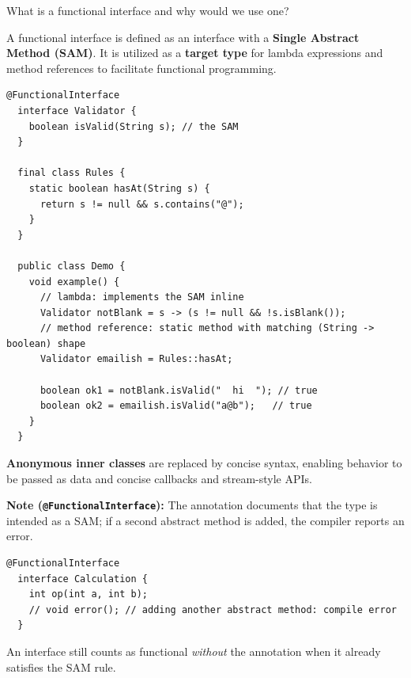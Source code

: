 






\question[4]
What is a functional interface and why would we use one?
\begin{solutionorbox}[1.00in]
  A functional interface is defined as an interface with a \textbf{Single Abstract Method (SAM)}.
  It is utilized as a \textbf{target type} for lambda expressions and method references to
  facilitate functional programming.
  \begin{lstlisting}[style=java]
  @FunctionalInterface
  interface Validator {
    boolean isValid(String s); // the SAM
  }

  final class Rules {
    static boolean hasAt(String s) {
      return s != null && s.contains("@");
    }
  }

  public class Demo {
    void example() {
      // lambda: implements the SAM inline
      Validator notBlank = s -> (s != null && !s.isBlank());
      // method reference: static method with matching (String -> boolean) shape
      Validator emailish = Rules::hasAt;

      boolean ok1 = notBlank.isValid("  hi  "); // true
      boolean ok2 = emailish.isValid("a@b");   // true
    }
  }
  \end{lstlisting} 
  \textbf{Anonymous inner classes} are replaced by concise syntax, enabling behavior to be passed as data and concise callbacks and   stream-style APIs.

  \noindent\textbf{Note (\texttt{@FunctionalInterface}):}
  The annotation documents that the type is intended as a SAM; if a second abstract method is added, the compiler reports an error.
  \begin{lstlisting}[style=java]
  @FunctionalInterface
  interface Calculation {
    int op(int a, int b);
    // void error(); // adding another abstract method: compile error
  }
  \end{lstlisting}
  An interface still counts as functional \emph{without} the annotation when it already satisfies the SAM rule.
\end{solutionorbox}

